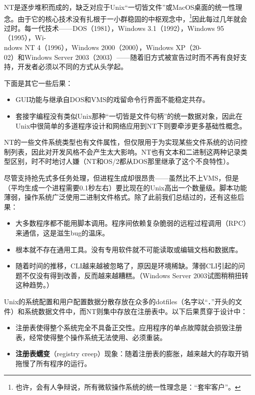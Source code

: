\documentclass[12pt,oneside]{book}
\begin{document}
\begin{common-format}
NT是逐步堆积而成的，缺乏对应于Unix“一切皆文件”或MacOS桌面的统一性理念。由于它的核心技术没有扎根于一小群稳固的中枢观念中，\footnote{也许，会有人争辩说，所有微软操作系统的统一性理念是：“套牢客户”。}因此每过几年就会过时。每一代技术——DOS（1981），Windows 3.1（1992），Windows 95（1995），Wi-\\ndows NT 4（1996），Windows 2000（2000），Windows XP（20-\\02）和Windows Server 2003（2003）——随着旧方式被宣告过时而不再有良好支持，开发者必须以不同的方式从头学起。

下面是其它一些后果：
\begin{itemize}
\item GUI功能与继承自DOS和VMS的戏留命令行界面不能稳定共存。
\item 套接字编程没有类似Unix那种“一切皆是文件句柄”的统一数据对象，因此在Unix中很简单的多道程序设计和网络应用到NT下则要牵涉更多基础性概念。
\end{itemize}

NT的一些文件系统类型也有文件属性，但仅限用于为实现某些文件系统的访问控制列表，因此对开发风格不会产生太大影响。NT也有文本和二进制这两种记录类型区别，时不时地讨人嫌（NT和OS/2都从DOS那里继承了这个不良特性）。

尽管支持抢先式多任务处理，但进程生成却很昂贵——虽然比不上VMS，但是（平均生成一个进程需要0.1秒左右）要比现在的Unix高出一个数量级。脚本功能薄弱，操作系统广泛使用二进制文件格式。除了此前我们总结过的，还有这些后果：

\begin{itemize}
\item 大多数程序都不能用脚本调用。程序间依赖复杂脆弱的远程过程调用（RPC）来通信，这是滋生bug的温床。
\item 根本就不存在通用工具。没有专用软件就不可能读取或编辑文档和数据库。
\item 随着时间的推移，CLI越来越被忽略了，原因是环境稀缺。薄弱CLI引起的问题不仅没有得到改善，反而越来越糟糕。（Windows Server 2003试图稍稍扭转这种趋势。）
\end{itemize}

Unix的系统配置和用户配置数据分散存放在众多的dotfiles（名字以“．”开头的文件）和系统数据文件中，而NT则集中存放在注册表中。以下后果贯穿于设计中：

\begin{itemize}
\item 注册表使得整个系统完全不具备正交性。应用程序的单点故障就会损毁注册表，经常使得整个操作系统无法使用、必须重装。
\item \textbf{注册表蠕变}（registry creep）现象：随着注册表的膨胀，越来越大的存取开销拖慢了所有程序的运行。
\end{itemize}


\end{common-format}
\end{document}
